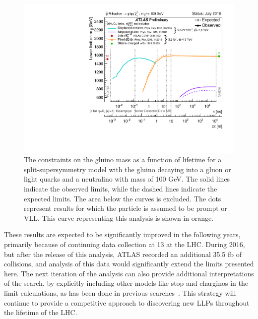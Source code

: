 \begin{figure}[htbp]
\centering
\includegraphics[width=\fullfig]{figures/combined_rhadrons.pdf}  
\caption{The constraints on the gluino mass as a function of lifetime for a split-supersymmetry model with the gluino \rhadrons decaying into a gluon or light quarks and a neutralino with mass of 100 GeV. The solid lines indicate the observed limits, while the dashed lines indicate the expected limits. The area below the curves is excluded. The dots represent results for which the particle is assumed to be prompt or \ac{VLL}. This curve representing this analysis is shown in orange.}
\label{fig:combined_rhadrons}
\end{figure}

These results are expected to be significantly improved in the following years, primarily because of continuing data collection at 13 \TeV at the \ac{LHC}.
During 2016, but after the release of this analysis, ATLAS recorded an additional 35.5 fb of collisions, and analysis of this data would significantly extend the limits presented here.
The next iteration of the analysis can also provide additional interpretations of the search, by explicitly including other models like stop \rhadrons and charginos in the limit calculations, as has been done in previous searches~\cite{SUSY-2014-09}.
This strategy will continue to provide a competitive approach to discovering new \acp{LLP} throughout the lifetime of the \ac{LHC}.
